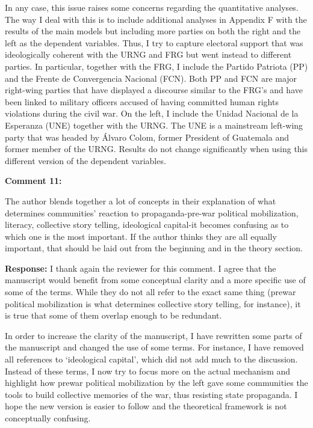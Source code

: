 \documentclass[12pt, a4paper, notitlepage]{article}
\begin{document}
In any case, this issue raises some concerns regarding the quantitative analyses. The way I deal with this is to include additional analyses in Appendix F with the results of the main models but including more parties on both the right and the left as the dependent variables.
Thus, I try to capture electoral support that was ideologically coherent with the URNG and FRG but went instead to different parties.
In particular, together with the FRG, I include the Partido Patriota (PP) and the Frente de Convergencia Nacional (FCN).
Both PP and FCN are major right-wing parties that have displayed a discourse similar to the FRG's and have been linked to military officers accused of having committed human rights violations during the civil war.
On the left, I include the Unidad Nacional de la Esperanza (UNE) together with the URNG. The UNE is a mainstream left-wing party that was headed by Álvaro Colom, former President of Guatemala and former member of the URNG.
Results do not change significantly when using this different version of the dependent variables.

\vspace{15pt}
\noindent\textbf{Comment 11:}
\begin{displayquote}
The author blends together a lot of concepts in their explanation of what determines communities' reaction to propaganda-pre-war political mobilization, literacy, collective story telling, ideological capital-it becomes confusing as to which one is the most important. If the author thinks they are all equally important, that should be laid out from the beginning and in the theory section.
\end{displayquote}

\noindent\textbf{Response:} I thank again the reviewer for this comment. I agree that the manuscript would benefit from some conceptual clarity and a more specific use of some of the terms. While they do not all refer to the exact same thing (prewar political mobilization is what determines collective story telling, for instance), it is true that some of them overlap enough to be redundant.

In order to increase the clarity of the manuscript, I have rewritten some parts of the manuscript and changed the use of some terms. For instance, I have removed all references to `ideological capital', which did not add much to the discussion. Instead of these terms, I now try to focus more on the actual mechanism and highlight how prewar political mobilization by the left gave some communities the tools to build collective memories of the war, thus resisting state propaganda. I hope the new version is easier to follow and the theoretical framework is not conceptually confusing.
\end{document}
